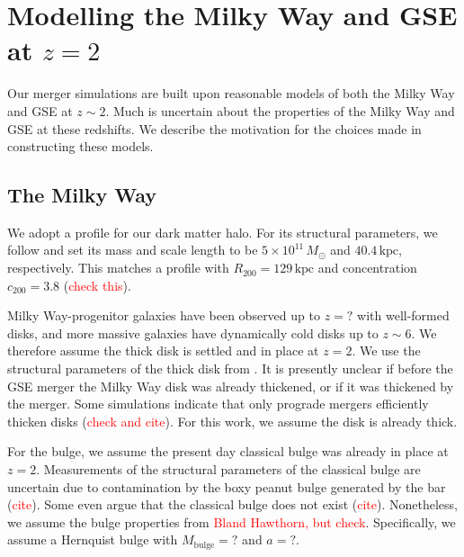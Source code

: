\documentclass[linenumbers, twocolumn]{aastex631}
\newcommand{\Msun}{\ensuremath{M_{\odot}}}
\newcommand{\kpc}{\ensuremath{\textrm{kpc}}}
\begin{document}
{}




\appendix

\section{Modelling the Milky Way and GSE at $z=2$}


Our merger simulations are built upon reasonable models of both the Milky Way
and GSE at $z\sim2$. Much is uncertain about the properties of the Milky Way and
GSE at these redshifts.  We describe the motivation for the choices made in
constructing these models.

\subsection{The Milky Way}
We adopt a \citet{1990ApJ...356..359H} profile for our dark matter halo. For its
structural parameters, we follow \citet{2021ApJ...923...92N} and set its mass
and scale length to be $5\times10^{11}\,\Msun$ and $40.4\,\kpc$, respectively.
This matches a \citet{1996ApJ...462..563N} profile with
$R_{200}=129\,\textrm{kpc}$ and concentration $c_{200}=3.8$
(\textcolor{red}{check this}).

Milky Way-progenitor galaxies have been observed up to $z=?$ with well-formed
disks, and more massive galaxies have dynamically cold disks up to $z\sim6$. We
therefore assume the thick disk is settled and in place at $z=2$. We use the
structural parameters of the thick disk from . It is presently unclear if before
the GSE merger the Milky Way disk was already thickened, or if it was thickened
by the merger. Some simulations indicate that only prograde mergers efficiently
thicken disks (\textcolor{red}{check and cite}). For this work, we assume the
disk is already thick.

For the bulge, we assume the present day classical bulge was already in place at
$z=2$. Measurements of the structural parameters of the classical bulge are
uncertain due to contamination by the boxy peanut bulge generated by the bar
(\textcolor{red}{cite}). Some even argue that the classical bulge does not exist
(\textcolor{red}{cite}). Nonetheless, we assume the bulge properties from
\textcolor{red}{Bland Hawthorn, but check}. Specifically, we assume a Hernquist
bulge with $M_{\textrm{bulge}}=?$ and $a=?$.
\end{document}
